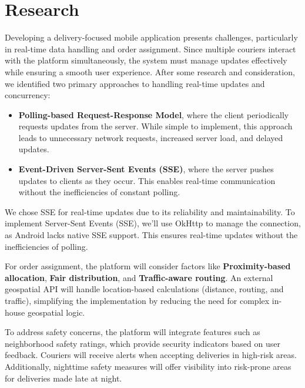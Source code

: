 \documentclass[a4paper,twoside,11pt]{article}
\begin{document}
\section*{Research}

Developing a delivery-focused mobile application presents challenges, particularly in real-time data handling and order assignment. Since multiple couriers interact with the platform simultaneously, the system must manage updates effectively while ensuring a smooth user experience. After some research and consideration, we identified two primary approaches to handling real-time updates and concurrency:

\begin{itemize}
    \item \textbf{Polling-based Request-Response Model}, where the client periodically requests updates from the server. While simple to implement, this approach leads to unnecessary network requests, increased server load, and delayed updates.
    \item \textbf{Event-Driven Server-Sent Events (SSE)}, where the server pushes updates to clients as they occur. This enables real-time communication without the inefficiencies of constant polling.
\end{itemize}

We chose SSE for real-time updates due to its reliability and maintainability. To implement Server-Sent Events (SSE), we'll use OkHttp to manage the connection, as Android lacks native SSE support. This ensures real-time updates without the inefficiencies of polling.

\vspace{2mm}

For order assignment, the platform will consider factors like \textbf{Proximity-based allocation}, \textbf{Fair distribution}, and \textbf{Traffic-aware routing}. An external geospatial API will handle location-based calculations (distance, routing, and traffic), simplifying the implementation by reducing the need for complex in-house geospatial logic.

\vspace{2mm}

To address safety concerns, the platform will integrate features such as neighborhood safety ratings, which provide security indicators based on user feedback. Couriers will receive alerts when accepting deliveries in high-risk areas. Additionally, nighttime safety measures will offer visibility into risk-prone areas for deliveries made late at night.
\end{document}
